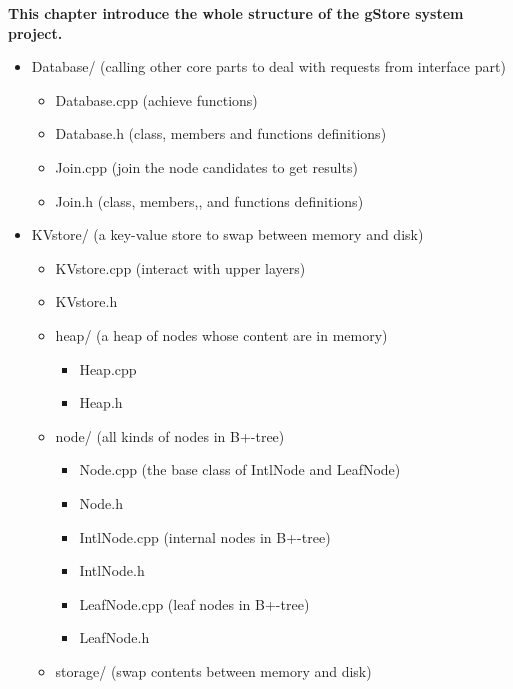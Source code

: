 \documentclass[titlepage, a4paper, 12pt]{article}
\begin{document}
\textbf{This chapter introduce the whole structure of the gStore system project.}


\begin{itemize}
\item
  Database/ (calling other core parts to deal with requests from
  interface part)

  \begin{itemize}
  \item
    Database.cpp (achieve functions)
  \item
    Database.h (class, members and functions definitions)
  \item
    Join.cpp (join the node candidates to get results)
  \item
    Join.h (class, members,, and functions definitions)
  \end{itemize}
\item
  KVstore/ (a key-value store to swap between memory and disk)

  \begin{itemize}
  \item
    KVstore.cpp (interact with upper layers)
  \item
    KVstore.h
  \item
    heap/ (a heap of nodes whose content are in memory)

    \begin{itemize}
    \item
      Heap.cpp
    \item
      Heap.h
    \end{itemize}
  \item
    node/ (all kinds of nodes in B+-tree)

    \begin{itemize}
    \item
      Node.cpp (the base class of IntlNode and LeafNode)
    \item
      Node.h
    \item
      IntlNode.cpp (internal nodes in B+-tree)
    \item
      IntlNode.h
    \item
      LeafNode.cpp (leaf nodes in B+-tree)
    \item
      LeafNode.h
    \end{itemize}
  \item
    storage/ (swap contents between memory and disk)


\end{itemize}
\end{itemize}
\end{document}
